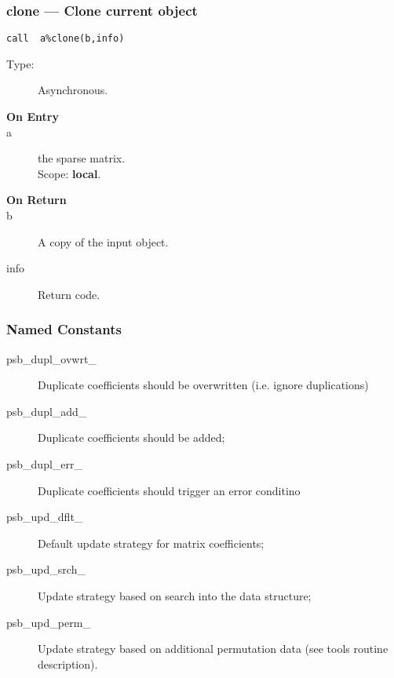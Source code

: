 \subsubsection{clone --- Clone current object}

\begin{verbatim}
call  a%clone(b,info)
\end{verbatim}

\begin{description}
\item[Type:] Asynchronous.
\item[\bf On Entry]
\item[a] the sparse matrix.\\
Scope: {\bf local}.\\
\end{description}

\begin{description}
\item[\bf On Return]
\item[b] A copy of the input object.
\item[info] Return code. 
\end{description}


\subsubsection{Named Constants}
\label{sec:sp_constants}
\begin{description}
\item[psb\_dupl\_ovwrt\_] Duplicate coefficients should be overwritten
  (i.e. ignore duplications)
\item[psb\_dupl\_add\_] Duplicate coefficients should be added;	         
\item[psb\_dupl\_err\_] Duplicate coefficients should trigger an error conditino
\item[psb\_upd\_dflt\_] Default update strategy for matrix coefficients;
\item[psb\_upd\_srch\_] Update strategy based on search into the data structure;
\item[psb\_upd\_perm\_] Update strategy based on additional
  permutation data (see tools routine description).
\end{description}


